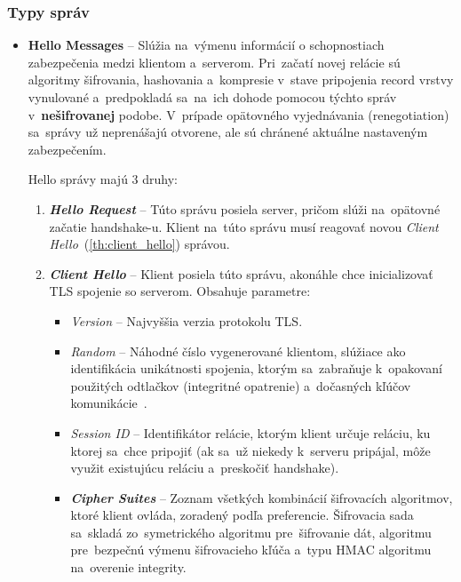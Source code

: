 \subsubsection{Typy správ}\label{message_type}
\begin{itemize}
    \item \textbf{Hello Messages} -- Slúžia na~výmenu informácií o schopnostiach zabezpečenia medzi klientom a~serverom. Pri~začatí novej relácie sú algoritmy šifrovania, hashovania a~kompresie v~stave pripojenia record vrstvy vynulované a~predpokladá sa~na~ich dohode pomocou týchto správ v~\textbf{nešifrovanej} podobe. V~prípade opätovného vyjednávania (renegotiation) sa~správy už neprenášajú otvorene, ale sú chránené aktuálne nastaveným zabezpečením. 
    
    Hello správy majú 3 druhy: 
    \begin{enumerate}
        \item \textbf{\textit{Hello Request}} -- Túto správu posiela server, pričom slúži na~opätovné začatie handshake-u. Klient na~túto správu musí reagovať novou \textit{Client Hello}~(\ref{th:client_hello}) správou.

        \item \textbf{\textit{Client Hello}}\label{th:client_hello} -- Klient posiela túto správu, akonáhle chce inicializovať TLS spojenie so serverom. Obsahuje parametre:
        \begin{itemize}
            \item \textit{Version} -- Najvyššia verzia protokolu TLS.
            
            \item \textit{Random} -- Náhodné číslo vygenerované klientom, slúžiace ako identifikácia unikátnosti spojenia, ktorým sa~zabraňuje k~opakovaní použitých odtlačkov (integritné opatrenie) a~dočasných kľúčov komunikácie~\cite{oppliger2023ssl}.
            
            \item \textit{Session ID} -- Identifikátor relácie, ktorým klient určuje reláciu, ku ktorej sa~chce pripojiť (ak sa~už niekedy k~serveru pripájal, môže využit existujúcu reláciu a~preskočiť handshake).
            
            \item \textbf{\textit{Cipher Suites}}\label{th:cipher_suites} -- Zoznam všetkých kombinácií šifrovacích algoritmov, ktoré klient ovláda, zoradený podľa preferencie.  Šifrovacia sada sa~skladá zo~symetrického algoritmu pre~šifrovanie dát, algoritmu pre~bezpečnú výmenu šifrovacieho kľúča a~typu HMAC algoritmu na~overenie integrity.
            

\end{itemize}
\end{enumerate}
\end{itemize}
